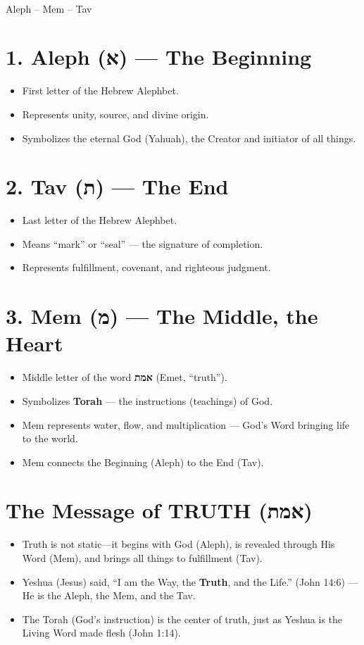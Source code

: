 \documentclass[12]{amsart}
\theoremstyle{plain}
\begin{document}
\begin{center}
\Huge\textbf{} \\
\large Aleph -- Mem -- Tav
\end{center}

\section*{1. Aleph (א) — The Beginning}
\begin{itemize}
  \item First letter of the Hebrew Alephbet.
  \item Represents unity, source, and divine origin.
  \item Symbolizes the eternal God (Yahuah), the Creator and initiator of all things.
\end{itemize}

\section*{2. Tav (ת) — The End}
\begin{itemize}
  \item Last letter of the Hebrew Alephbet.
  \item Means ``mark'' or ``seal'' — the signature of completion.
  \item Represents fulfillment, covenant, and righteous judgment.
\end{itemize}

\section*{3. Mem (מ) — The Middle, the Heart}
\begin{itemize}
  \item Middle letter of the word \textbf{אמת} (Emet, “truth”).
  \item Symbolizes \textbf{Torah} — the instructions (teachings) of God.
  \item Mem represents water, flow, and multiplication — God's Word bringing life to the world.
  \item Mem connects the Beginning (Aleph) to the End (Tav).
\end{itemize}

\section*{The Message of TRUTH (אמת)}
\begin{itemize}
  \item Truth is not static—it begins with God (Aleph), is revealed through His Word (Mem), and brings all things to fulfillment (Tav).
  \item Yeshua (Jesus) said, “I am the Way, the \textbf{Truth}, and the Life.” (John 14:6) — He is the Aleph, the Mem, and the Tav.
  \item The Torah (God's instruction) is the center of truth, just as Yeshua is the Living Word made flesh (John 1:14).
\end{itemize}
\end{document}
